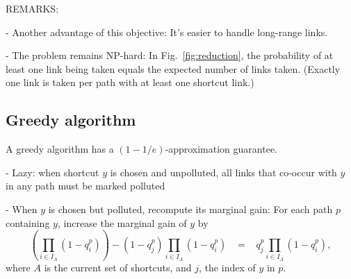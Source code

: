 \documentclass[11pt,letterpaper]{article}
\begin{document}
REMARKS:

- Another advantage of this objective: It's easier to handle long-range links.

- The problem remains NP-hard: In Fig.~\ref{fig:reduction}, the probability of at least one link being taken equals the expected number of links taken. (Exactly one link is taken per path with at least one shortcut link.)



\subsection{Greedy algorithm}

A greedy algorithm has a $(1-1/e)$-approximation guarantee.

- Lazy: when shortcut $y$ is chosen and unpolluted, all links that co-occur with $y$ in any path must be marked polluted

- When $y$ is chosen but polluted, recompute its marginal gain: For each path $p$ containing $y$, increase the marginal gain of $y$ by 
$$\left(\prod_{i \in I_A} \left( 1 - q^p_i \right)\right) - (1 - q^p_j) \prod_{i \in I_A} \left( 1 - q^p_i \right)
\;\;\;=\;\;\; q^p_j \prod_{i \in I_A} \left( 1 - q^p_i \right),$$
where $A$ is the current set of shortcuts, and $j$, the index of $y$ in $p$.
\end{document}
